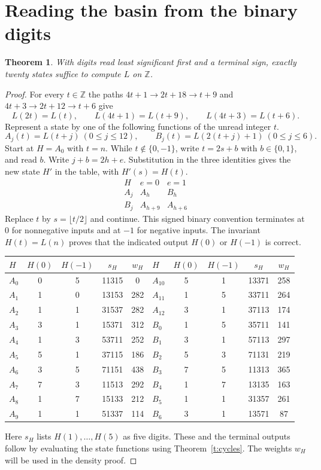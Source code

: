\documentclass[11pt,a4paper]{article}
\newtheorem{theorem}{Theorem}
\newcommand{\Z}{\mathbb Z}
\begin{document}
\newpage
\section{Reading the basin from the binary digits}
\begin{theorem}
With digits read least significant first and a terminal sign, exactly twenty states suffice to compute $L$ on $\Z$.
\end{theorem}
\begin{proof}
For every $t\in\Z$ the paths $4t+1\to2t+18\to t+9$ and $4t+3\to2t+12\to t+6$ give
\[
 L(2t)=L(t),\qquad L(4t+1)=L(t+9),\qquad L(4t+3)=L(t+6).
\]
Represent a state by one of the following functions of the unread integer $t$.
\[
 A_j(t)=L(t+j)\ (0\le j\le12),\qquad B_j(t)=L(2(t+j)+1)\ (0\le j\le6).
\]
Start at $H=A_0$ with $t=n$. While $t\notin\{0,-1\}$, write $t=2s+b$ with $b\in\{0,1\}$, and read $b$. Write $j+b=2h+e$. Substitution in the three identities gives the new state $H'$ in the table, with $H'(s)=H(t)$.
\[
\begin{array}{c|cc}
 H & e=0 & e=1\\ \hline
 A_j & A_h & B_h\\
 B_j & A_{h+9} & A_{h+6}
\end{array}
\]
Replace $t$ by $s=\lfloor t/2\rfloor$ and continue. This signed binary convention terminates at $0$ for nonnegative inputs and at $-1$ for negative inputs. The invariant $H(t)=L(n)$ proves that the indicated output $H(0)$ or $H(-1)$ is correct.

\begin{center}
\small
\begin{tabular}{@{}lcccc@{\qquad}lcccc@{}}
\toprule
$H$ & $H(0)$ & $H(-1)$ & $s_H$ & $w_H$ &
$H$ & $H(0)$ & $H(-1)$ & $s_H$ & $w_H$\\
\midrule
$A_0$ &0&5&11315&0   & $A_{10}$&5&1&13371&258\\
$A_1$ &1&0&13153&282 & $A_{11}$&1&5&33711&264\\
$A_2$ &1&1&31537&282 & $A_{12}$&3&1&37113&174\\
$A_3$ &3&1&15371&312 & $B_0$&1&5&35711&141\\
$A_4$ &1&3&53711&252 & $B_1$&3&1&57113&297\\
$A_5$ &5&1&37115&186 & $B_2$&5&3&71131&219\\
$A_6$ &3&5&71151&438 & $B_3$&7&5&11313&365\\
$A_7$ &7&3&11513&292 & $B_4$&1&7&13135&163\\
$A_8$ &1&7&15133&212 & $B_5$&1&1&31357&261\\
$A_9$ &1&1&51337&114 & $B_6$&3&1&13571&87\\
\bottomrule
\end{tabular}
\end{center}
Here $s_H$ lists $H(1),\dots,H(5)$ as five digits. These and the terminal outputs follow by evaluating the state functions using Theorem~\ref{t:cycles}. The weights $w_H$ will be used in the density proof.


\end{proof}
\end{document}
